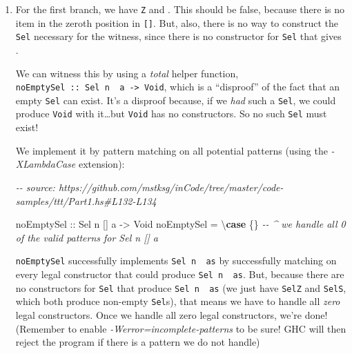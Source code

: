 \documentclass[]{article}
\newenvironment{Shaded}{}{}
\newcommand{\CommentTok}[1]{\textcolor[rgb]{0.38,0.63,0.69}{\textit{#1}}}
\newcommand{\DataTypeTok}[1]{\textcolor[rgb]{0.56,0.13,0.00}{#1}}
\newcommand{\KeywordTok}[1]{\textcolor[rgb]{0.00,0.44,0.13}{\textbf{#1}}}
\newcommand{\NormalTok}[1]{#1}
\newcommand{\OtherTok}[1]{\textcolor[rgb]{0.00,0.44,0.13}{#1}}
\begin{document}
\begin{enumerate}
\def\labelenumi{\arabic{enumi}.}
\item
  For the first branch, we have \texttt{\textquotesingle{}Z} and
  \texttt{\textquotesingle{}{[}{]}}. This should be false, because there is no
  item in the zeroth position in \texttt{{[}{]}}. But, also, there is no way to
  construct the \texttt{Sel} necessary for the witness, since there is no
  constructor for \texttt{Sel} that gives \texttt{\textquotesingle{}{[}{]}}.

  We can witness this by using a \emph{total} helper function,
  \texttt{noEmptySel\ ::\ Sel\ n\ \textquotesingle{}{[}{]}\ a\ -\textgreater{}\ Void},
  which is a ``disproof'' of the fact that an empty \texttt{Sel} can exist. It's
  a disproof because, if we \emph{had} such a \texttt{Sel}, we could produce
  \texttt{Void} with it\ldots but \texttt{Void} has no constructors. So no such
  \texttt{Sel} must exist!

  We implement it by pattern matching on all potential patterns (using the
  \emph{-XLambdaCase} extension):

\begin{Shaded}
\begin{Highlighting}[]
\CommentTok{{-}{-} source: https://github.com/mstksg/inCode/tree/master/code{-}samples/ttt/Part1.hs\#L132{-}L134}

\OtherTok{noEmptySel ::} \DataTypeTok{Sel}\NormalTok{ n \textquotesingle{}[] a }\OtherTok{{-}>} \DataTypeTok{Void}
\NormalTok{noEmptySel }\OtherTok{=}\NormalTok{ \textbackslash{}}\KeywordTok{case}\NormalTok{ \{\}}
            \CommentTok{{-}{-} \^{} we handle all 0 of the valid patterns for Sel n \textquotesingle{}[] a}
\end{Highlighting}
\end{Shaded}

  \texttt{noEmptySel} successfully implements
  \texttt{Sel\ n\ \textquotesingle{}{[}{]}\ as} by successfully matching on
  every legal constructor that could produce
  \texttt{Sel\ n\ \textquotesingle{}{[}{]}\ as}. But, because there are no
  constructors for \texttt{Sel} that produce
  \texttt{Sel\ n\ \textquotesingle{}{[}{]}\ as} (we just have \texttt{SelZ} and
  \texttt{SelS}, which both produce non-empty \texttt{Sel}s), that means we have
  to handle all \emph{zero} legal constructors. Once we handle all zero legal
  constructors, we're done! (Remember to enable
  \emph{-Werror=incomplete-patterns} to be sure! GHC will then reject the
  program if there is a pattern we do not handle)


\end{enumerate}
\end{document}
